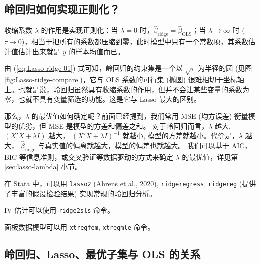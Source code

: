 \subsection{岭回归如何实现正则化？}

收缩系数 $\lambda$ 的作用是实现正则化：当 $\lambda=0$ 时，$\widehat{\beta}_{\text {ridge}}=\widehat{\beta}_{\text {OLS}}$；当 $\lambda \to \infty$ 时 ($\tau \to 0$)，相当于把所有的系数都压缩到零，此时模型中只有一个常数项，其系数估计值估计出来就是 $y$ 的样本均值而已。

由 (\ref{eq:Lasso-ridge-01}) 式可知，岭回归的约束集是一个以 $\sqrt{\tau}$ 为半径的圆 (见图 \ref{fig:Lasso-ridge-compare})，它与 OLS 系数的可行集 (椭圆) 很难相切于坐标轴上。也就是说，岭回归虽然具有收缩系数的作用，但并不会让某些变量的系数为零，也就不具有变量筛选的功能。这是它与 Lasso 最大的区别。   

那么，$\lambda$ 的最优值如何确定呢？前面已经提到，我们常用 MSE (均方误差) 衡量模型的优劣，但 MSE 是模型的方差和偏差之和。
对于岭回归而言，$\lambda$ 越大, $(X'X+\lambda I)$ 越大， $\left(X'X+\lambda I\right)^{-1}$ 就越小, 模型的方差就越小。代价是，$\lambda$ 越大， $\widehat{\beta}_{\text {ridge}}$ 与真实值的偏离就越大，模型的偏差也就越大。
我们可以基于 AIC，BIC 等信息准则，或交叉验证等数据驱动的方式来确定 $\lambda$ 的最优值，详见第 \ref{sec:lasso-lambda} 小节。

在 Stata 中，可以用 \texttt{lasso2} (Ahrens et al., 2020), \texttt{ridgeregress}, \texttt{ridgereg} (提供了丰富的假设检验结果) 实现常规的岭回归分析。

IV 估计可以使用 \texttt{ridge2sls} 命令。 

面板数据模型可以用 \texttt{xtregfem}, \texttt{xtregmle} 命令。 

\subsection{岭回归、Lasso、最优子集与 OLS 的关系}



